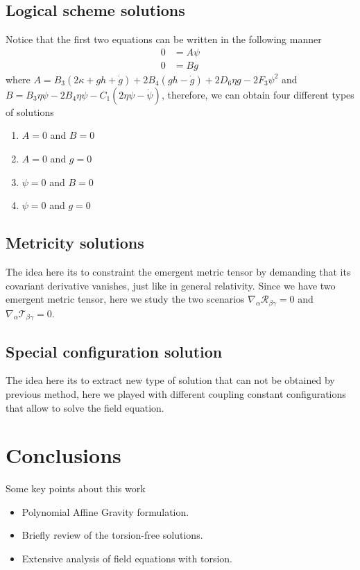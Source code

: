 \documentclass[10pt,a4paper]{article}
\begin{document}
\subsection{Logical scheme solutions}

Notice that the first two equations can be written in the following manner
\begin{align}
  0 & = A \psi  \\
  0 & = B g 
\end{align}
where $A = B_3(2 \kappa+g h+\dot{g})+2 B_4(g h-\dot{g})+2 D_6 \eta g-2 F_3 \psi^2$ and $B = B_3 \eta \psi-2 B_4 \eta \psi-C_1(2 \eta \psi-\dot{\psi})$, therefore,
we can obtain four different types of solutions
\begin{enumerate}
  \item $A = 0$ and $B = 0$
  \item $A = 0$ and $g = 0$
  \item $\psi = 0$ and $B = 0$
  \item $\psi = 0$ and $g = 0$
\end{enumerate}


\subsection{Metricity solutions}

The idea here its to constraint the emergent metric tensor by demanding that its covariant derivative vanishes, just like in general relativity. Since we have
two emergent metric tensor, here we study the two scenarios $\nabla_\alpha \mathcal{R}_{\beta\gamma} = 0$ and $\nabla_\alpha \mathcal{T}_{\beta\gamma} = 0$.


\subsection{Special configuration solution}

The idea here its to extract new type of solution that can not be obtained by previous method, here we played with different coupling constant
configurations that allow to solve the field equation.


\section{Conclusions}

Some key points about this work

\begin{itemize}
  \item Polynomial Affine Gravity formulation.
  \item Briefly review of the torsion-free solutions.
  \item Extensive analysis of field equations with torsion.
\end{itemize}
\end{document}
